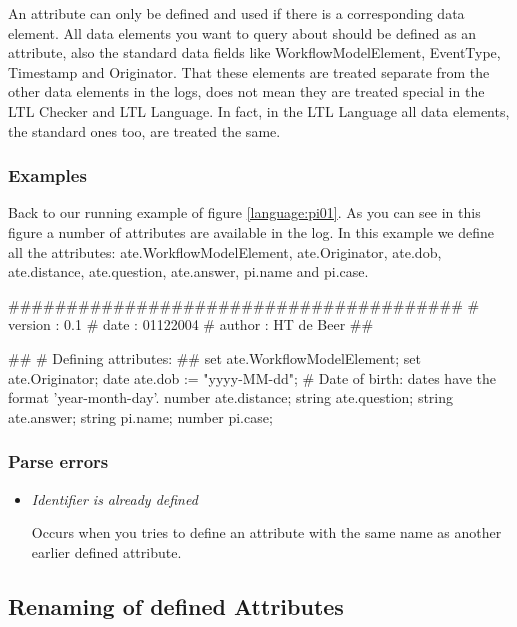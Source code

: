 An attribute can only be defined and used if there is a corresponding data
element. All data elements you want to query about should be defined as
an attribute, also the standard data fields like WorkflowModelElement,
EventType, Timestamp and Originator. That these elements are treated separate
from the other data elements in the logs, does not mean they are treated
special in the LTL Checker and LTL Language. In fact, in the LTL Language all
data elements, the standard ones too, are treated the same.

\subsubsection{Examples}

Back to our running example of figure \ref{language:pi01}. As you can see in
this figure a number of attributes are available in the log. In this example
we define all the attributes: ate.WorkflowModelElement, ate.Originator,
ate.dob, ate.distance, ate.question, ate.answer, pi.name and pi.case.

\begin{ltlcode}
#######################################
# version  : 0.1
# date     : 01122004
# author   : HT de Beer
##

## 
# Defining attributes:
##
set ate.WorkflowModelElement;
set ate.Originator;
date ate.dob := "yyyy-MM-dd"; # Date of birth: dates have the format 'year-month-day'.
number ate.distance;
string ate.question;
string ate.answer;
string pi.name;
number pi.case;
\end{ltlcode}

\subsubsection{Parse errors}

\begin{itemize}
    \item \textit{Identifier is already defined} 
    
    Occurs when you tries to define an
    attribute with the same name as another earlier defined attribute.    
\end{itemize}

\subsection{Renaming of defined Attributes}
\label{language:renaming}

